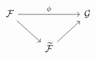 \documentclass[12pt]{standalone}
\begin{document}
        $$

\begin{tikzcd}
\mathcal F \ar[rr,"\phi"] \ar[rd] & & \mathcal G \\
& \widetilde{\mathcal F} \ar[ur] &
\end{tikzcd}
        $$
        
\end{document}
